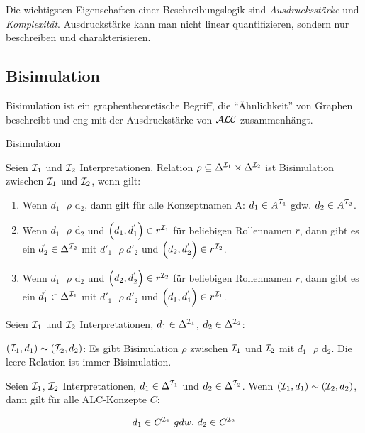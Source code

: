 Die wichtigsten Eigenschaften einer Beschreibungslogik sind
\emph{Ausdrucksstärke} und \emph{Komplexität}. Ausdruckstärke kann man
nicht linear quantifizieren, sondern nur beschreiben und
charakterisieren.

\subsection{Bisimulation}\label{bisimulation}

Bisimulation ist ein graphentheoretische Begriff, die ``Ähnlichkeit'' von Graphen beschreibt und eng mit der Ausdruckstärke von $\mathcal{A}\mathcal{L}\mathcal{C}$ zusammenhängt.

\begin{definition}{Bisimulation}

Seien $\mathcal{I}_{1}$ und $\mathcal{I}_{2}$ Interpretationen. Relation
$\rho \subseteq \Delta^{\mathcal{I}_{1}} \times \Delta^{\mathcal{I}_{2}}$ ist Bisimulation
zwischen $\mathcal{I}_{1}$ und $\mathcal{I}_{2}$, wenn gilt:

\begin{enumerate}
\def\labelenumi{\arabic{enumi}.}
\item
  Wenn $d_{1}\text{\ $\rho$}\text{\ d}_{2}$, dann gilt für alle
  Konzeptnamen A: $d_{1} \in A^{\mathcal{I}_{1}}$ gdw. $d_{2} \in A^{\mathcal{I}_{2}}$.
\item
  Wenn $d_{1}\text{\ $\rho$}\text{\ d}_{2}$ und
  $\left( d_{1},d_{1}^{'} \right) \in r^{\mathcal{I}_{1}}$ für beliebigen
  Rollennamen $r$, dann gibt es ein $d_{2}^{'} \in \Delta^{\mathcal{I}_{2}}$
  mit ${d'}_{1}\text{\ $\rho$}{\ d'}_{2}$ und
  $\left( d_{2},d_{2}^{'} \right) \in r^{\mathcal{I}_{2}}$.
\item
  Wenn $d_{1}\text{\ $\rho$}\text{\ d}_{2}$ und
  $\left( d_{2},d_{2}^{'} \right) \in r^{\mathcal{I}_{2}}$ für beliebigen
  Rollennamen $r$, dann gibt es ein $d_{1}^{'} \in \Delta^{\mathcal{I}_{1}}$
  mit ${d'}_{1}\text{\ $\rho$}{\ d'}_{2}$ und
  $\left( d_{1},d_{1}^{'} \right) \in r^{\mathcal{I}_{1}}$.
\end{enumerate}
\end{definition}

Seien $\mathcal{I}_{1}$ und $\mathcal{I}_{2}$ Interpretationen,
$d_{1} \in \Delta^{\mathcal{I}_{1}}$, $d_{2} \in \Delta^{\mathcal{I}_{2}}$:

$(\mathcal{I}_{1},d_{1}) \sim (\mathcal{I}_{2},d_{2})$: Es gibt Bisimulation $\rho$
zwischen $\mathcal{I}_{1}$ und $\mathcal{I}_{2}$ mit $d_{1}\text{\ $\rho$}\text{\ d}_{2}$.
Die leere Relation ist immer Bisimulation.

\begin{theorem}
Seien $\mathcal{I}_{1}$, $\mathcal{I}_{2}$ Interpretationen,
$d_{1} \in \Delta^{\mathcal{I}_{1}}$ und $d_{2} \in \Delta^{\mathcal{I}_{2}}$. Wenn
$(\mathcal{I}_{1},d_{1}) \sim (\mathcal{I}_{2},d_{2})$, dann gilt für alle ALC-Konzepte
$C$:

$$d_{1} \in C^{\mathcal{I}_{1}}\ gdw.\ d_{2} \in C^{\mathcal{I}_{2}}$$
\end{theorem}

